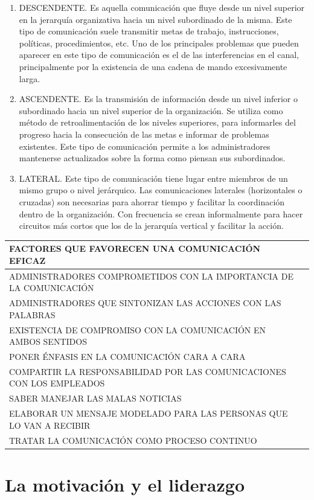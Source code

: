 \documentclass[
]{krantz}
\providecommand{\tightlist}{%
  \setlength{\itemsep}{0pt}\setlength{\parskip}{0pt}}
\begin{document}
\begin{enumerate}
\def\labelenumi{\arabic{enumi}.}
\tightlist
\item
  DESCENDENTE. Es aquella comunicación que fluye desde un nivel superior en la jerarquía organizativa hacia un nivel subordinado de la misma. Este tipo de comunicación suele transmitir metas de trabajo, instrucciones, políticas, procedimientos, etc. Uno de los principales problemas que pueden aparecer en este tipo de comunicación es el de las interferencias en el canal, principalmente por la existencia de una cadena de mando excesivamente larga.
\item
  ASCENDENTE. Es la transmisión de información desde un nivel inferior o subordinado hacia un nivel superior de la organización. Se utiliza como método de retroalimentación de los niveles superiores, para informarles del progreso hacia la consecución de las metas e informar de problemas existentes. Este tipo de comunicación permite a los administradores mantenerse actualizados sobre la forma como piensan sus subordinados.
\item
  LATERAL. Este tipo de comunicación tiene lugar entre miembros de un mismo grupo o nivel jerárquico. Las comunicaciones laterales (horizontales o cruzadas) son necesarias para ahorrar tiempo y facilitar la coordinación dentro de la organización. Con frecuencia se crean informalmente para hacer circuitos más cortos que los de la jerarquía vertical y facilitar la acción.
\end{enumerate}

\begin{longtable}[]{@{}ll@{}}
\toprule
FACTORES QUE FAVORECEN UNA COMUNICACIÓN EFICAZ &\tabularnewline
\midrule
\endhead
ADMINISTRADORES COMPROMETIDOS CON LA IMPORTANCIA DE LA COMUNICACIÓN &\tabularnewline
ADMINISTRADORES QUE SINTONIZAN LAS ACCIONES CON LAS PALABRAS &\tabularnewline
EXISTENCIA DE COMPROMISO CON LA COMUNICACIÓN EN AMBOS SENTIDOS &\tabularnewline
PONER ÉNFASIS EN LA COMUNICACIÓN CARA A CARA &\tabularnewline
COMPARTIR LA RESPONSABILIDAD POR LAS COMUNICACIONES CON LOS EMPLEADOS &\tabularnewline
SABER MANEJAR LAS MALAS NOTICIAS &\tabularnewline
ELABORAR UN MENSAJE MODELADO PARA LAS PERSONAS QUE LO VAN A RECIBIR &\tabularnewline
TRATAR LA COMUNICACIÓN COMO PROCESO CONTINUO &\tabularnewline
\bottomrule
\end{longtable}

\hypertarget{la-motivaciuxf3n-y-el-liderazgo}{%
\section{La motivación y el liderazgo}\label{la-motivaciuxf3n-y-el-liderazgo}}
\end{document}
